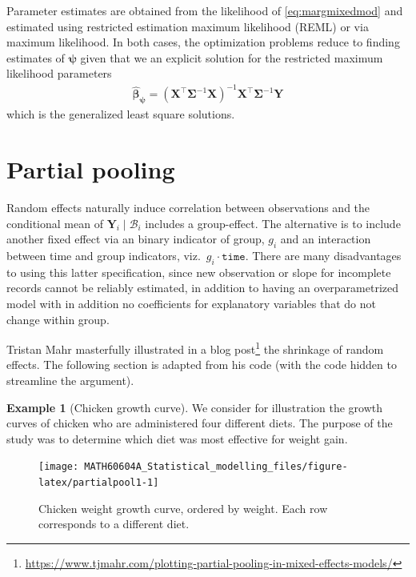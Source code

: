 \documentclass[
  11pt,
  letterpaper,
]{book}
\renewcommand{\href}[2]{#2\footnote{\url{#1}}}
\theoremstyle{definition}
\theoremstyle{definition}
\newtheorem{example}{Example}[chapter]
\theoremstyle{definition}
\theoremstyle{definition}
\theoremstyle{remark}
\begin{document}
Parameter estimates are obtained from the likelihood of \eqref{eq:margmixedmod} and estimated using restricted estimation maximum likelihood (REML) or via maximum likelihood. In both cases, the optimization problems reduce to finding estimates of \(\boldsymbol{\psi}\) given that we an explicit solution for the restricted maximum likelihood parameters
\begin{align*}
\widehat{\boldsymbol{\beta}}_{\boldsymbol{\psi}} = (\mathbf{X}^\top\boldsymbol{\Sigma}^{-1}\mathbf{X})^{-1}\mathbf{X}^\top\boldsymbol{\Sigma}^{-1}\boldsymbol{Y}
\end{align*}
which is the generalized least square solutions.

\hypertarget{partial-pooling}{%
\section{Partial pooling}\label{partial-pooling}}

Random effects naturally induce correlation between observations and the conditional mean of \(\boldsymbol{Y}_i \mid \mathcal{B}_i\) includes a group-effect. The alternative is to include another fixed effect via an binary indicator of group, \(g_i\) and an interaction between time and group indicators, viz.~\(g_i\cdot \texttt{time}\). There are many disadvantages to using this latter specification, since new observation or slope for incomplete records cannot be reliably estimated, in addition to having an overparametrized model with in addition no coefficients for explanatory variables that do not change within group.

\href{https://www.tjmahr.com/plotting-partial-pooling-in-mixed-effects-models/}{Tristan Mahr masterfully illustrated in a blog post} the shrinkage of random effects. The following section is adapted from his code (with the code hidden to streamline the argument).

\begin{example}[Chicken growth curve]
\protect\hypertarget{exm:chickcurve}{}{\label{exm:chickcurve} {} }We consider for illustration the growth curves of chicken who are administered four different diets. The purpose of the study was to determine which diet was most effective for weight gain.
\end{example}

\begin{figure}

{\centering \texttt{[image: MATH60604A\_Statistical\_modelling\_files/figure-latex/partialpool1-1]} 

}

\caption{Chicken weight growth curve, ordered by weight. Each row corresponds to a different diet.}\label{fig:partialpool1}
\end{figure}
\end{document}
